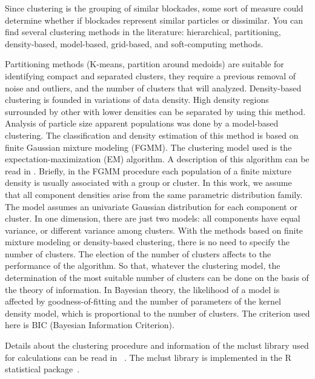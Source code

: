 \documentclass[journal=langd5,manuscript=article]{achemso}
\begin{document}
Since clustering is the grouping of similar blockades, some sort of measure could determine whether if blockades represent similar particles or dissimilar. You can find several  clustering methods in the literature:  hierarchical,  partitioning,  density-based,  model-based,  grid-based, and  soft-computing  methods\cite{Rokach2005}.

Partitioning methods (K-means, partition around medoids) are suitable for identifying compact and separated clusters, they require a previous removal of noise and outliers, and the number of clusters that will analyzed. 
Density-based clustering is founded in variations of data density. High density regions surrounded by other with lower densities can be separated by using this method. 
Analysis of particle size apparent populations was done by a model-based clustering. The classification and density estimation of this method is based on finite Gaussian mixture modeling (FGMM). The clustering model used is the expectation-maximization (EM) algorithm. A description  of this algorithm can be read in \citeauthor{Do2008} 
\cite{Do2008}. Briefly, in the FGMM procedure each population of a finite  mixture density is usually associated with a group or cluster. In this work, we assume that all component densities arise from the same parametric distribution family. The model assumes an univariate Gaussian distribution for each component or cluster. In one dimension, there are just two models: all components have equal variance, or different variance among clusters.
With the methods based on finite mixture modeling or density-based clustering, there is no need to specify the number of clusters. The election of the number of clusters affects to the performance of the algorithm. So that, whatever the clustering model, the
determination of the most suitable number of clusters can be done on the basis of the theory of information. In Bayesian
theory, the likelihood of a model is affected by goodness-of-fitting and the number of parameters of the kernel density model, which is proportional to the number of clusters. The criterion used here is BIC (Bayesian Information Criterion).

Details about the clustering procedure and information of the mclust library used for calculations can be read in
~\citeauthor{Fraley2012MclustEstimation}\cite{Fraley2012MclustEstimation}. The mclust library is implemented in the R statistical package~\cite{RCoreTeam2011}.
\end{document}
